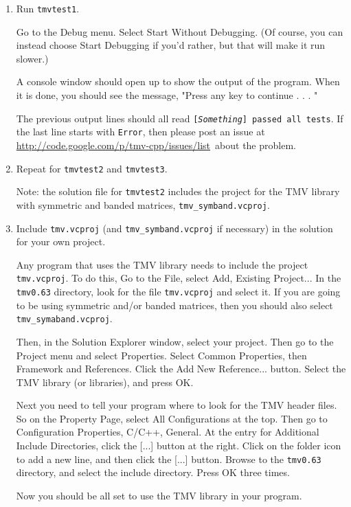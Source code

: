 \documentclass[twoside,letterpaper,11pt]{article}
\newcommand{\tmvversion}{0.63}
\newcommand{\myissuesx}{http://code.google.com/p/tmv-cpp/issues/list}
\newcommand{\myissues}{\url{\myissuesx}}
\begin{document}
\begin{enumerate}
\item 
Run \texttt{tmvtest1}.

Go to the Debug menu.  Select Start Without Debugging.  (Of course, you can instead
choose Start Debugging if you'd rather, but that will make it run slower.)

A console window should open up to show the output of the program.  
When it is done, you should see the message,
"Press any key to continue . . . "

The previous output lines should all read \texttt{[{\em Something}] passed all tests}.
If the last line starts with \texttt{Error}, 
then please post an issue at \myissues\ about the problem.

\item
Repeat for \texttt{tmvtest2} and \texttt{tmvtest3}.  

Note: the solution file for \texttt{tmvtest2} includes the
project for the TMV library with symmetric and banded matrices, \texttt{tmv\_symband.vcproj}.

\item
Include \texttt{tmv.vcproj} (and \texttt{tmv\_symband.vcproj} if necessary) in the solution for your own project.

Any program that uses the TMV library needs to include the project \texttt{tmv.vcproj}.  To do this,
Go to the File, select Add, Existing Project...
In the \texttt{tmv\tmvversion} directory, look for the file
\texttt{tmv.vcproj} and select it.  If you are going to be using symmetric and/or banded matrices,
then you should also select \texttt{tmv\_symaband.vcproj}.

Then, in the Solution Explorer window, select your project.  Then go to the Project menu
and select Properties.  Select Common Properties, then Framework and References.  
Click the Add New Reference... button.  Select the TMV library (or libraries), and press OK.

Next you need to tell your program where to look for the TMV header files.  So on the Property Page,
select All Configurations at the top.  Then go to Configuration Properties, C/C++, General.
At the entry for Additional Include Directories, click the [...] button at the right.  Click on the folder icon
to add a new line, and then click the [...] button.  Browse to the 
\texttt{tmv\tmvversion} directory, and select the include directory.  Press OK three times.

Now you should be all set to use the TMV library in your program.

\end{enumerate}
\end{document}
